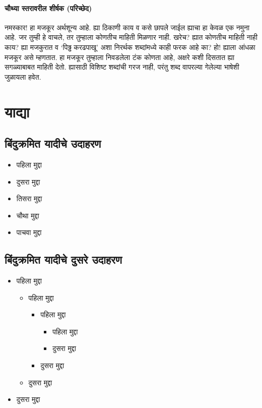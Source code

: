 \paragraph{चौथ्या स्तरावरील शीर्षक (परिच्छेद)}
नमस्कार! हा मजकूर अर्थशून्य आहे. ह्या ठिकाणी काय व कसे छापले जाईल ह्याचा हा केवळ एक नमुना
आहे. जर तुम्ही हे वाचले, तर तुम्हाला कोणतीच माहिती मिळणार नाही. खरेच? ह्यात कोणतीच माहिती
नाही काय? ह्या मजकुरात व `पिढ्ढ करढपाखू' अशा निरर्थक शब्दांमध्ये काही फरक आहे का? हो!
ह्याला आंधळा मजकूर असे म्हणतात. हा मजकूर तुम्हाला निवडलेला टंक कोणता आहे, अक्षरे कशी दिसतात
ह्या सगळ्याबाबत माहिती देतो. ह्यासाठी विशिष्ट शब्दांची गरज नाही, परंतु शब्द वापरल्या गेलेल्या
भाषेशी जुळायला हवेत.

\section{याद्या}

\subsection{बिंदुक्रमित यादीचे उदाहरण}

\begin{itemize}
\item पहिला मुद्दा
\item दुसरा मुद्दा
\item तिसरा मुद्दा
\item चौथा मुद्दा
\item पाचवा मुद्दा
\end{itemize}

\subsection*{बिंदुक्रमित यादीचे दुसरे उदाहरण}

\begin{itemize}
\item पहिला मुद्दा
  \begin{itemize}
  \item पहिला मुद्दा
    \begin{itemize}
    \item पहिला मुद्दा
      \begin{itemize}
      \item पहिला मुद्दा
      \item दुसरा मुद्दा
      \end{itemize}
    \item दुसरा मुद्दा
    \end{itemize}
  \item दुसरा मुद्दा
  \end{itemize}
\item दुसरा मुद्दा
\end{itemize}

